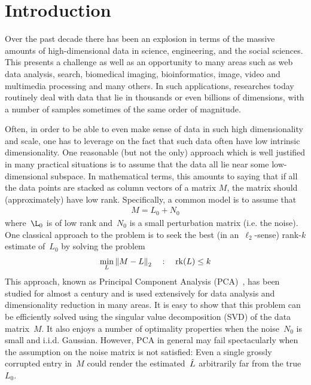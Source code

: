 \section*{Introduction}

Over the past decade there has been an explosion in terms of the massive amounts of high-dimensional data in science, engineering, and the social sciences. This presents a challenge as well as an opportunity to many areas such as web data analysis, search, biomedical imaging, bioinformatics, image, video and multimedia processing and many others. In such applications, researches today routinely deal with data that lie in thousands or even billions of dimensions, with a number of samples sometimes of the same order of magnitude.

Often, in order to be able to even make sense of data in such high dimensionality and scale, one has to leverage on the fact that such data often have low intrinsic dimensionality. One reasonable (but not the only) approach which is well justified in many practical situations is to assume that the data all lie near some low-dimensional subspace. In mathematical terms, this amounts to saying that if all the data points are stacked as column vectors of a matrix $M$, the matrix should (approximately) have low rank. Specifically, a common model is to assume that 
%
\begin{align}
M=L_0+N_0
\label{IntroMot:lowrankness}
\end{align}
%
where~$\L_0$ is of low rank and~$N_0$ is a small perturbation matrix (i.e. the noise). One classical approach to the problem is to seek the best (in an~$\ell_2$-sense) rank-$k$ estimate of~$L_0$ by solving the problem
%
\begin{align}
\min_L {\left\|M-L\right\|}_{2}^{} \quad:\quad \operatorname{rk}(L)\leq k
\label{IntroMot:ClassicPCA}
\end{align}
%
This approach, known as Principal Component Analysis (PCA)~\cite{Eckart:1936uq,Hotelling:1933fk}, has been studied for almost a century and is used extensively for data analysis and dimensionality reduction in many areas. It is easy to show that this problem can be efficiently solved using the singular value decomposition (SVD) of the data matrix~$M$. It also enjoys a number of optimality properties when the noise~$N_0$ is small and i.i.d. Gaussian. However, PCA in general may fail spectacularly when the assumption on the noise matrix is not satisfied: Even a single grossly corrupted entry in~$M$ could render the estimated~${\hat{L}}$ arbitrarily far from the true~$L_0$. 


